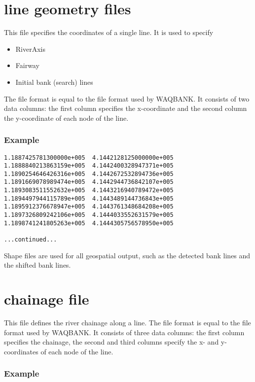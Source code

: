 \section{line geometry files}

This file specifies the coordinates of a single line.
It is used to specify

\begin{itemize}
\item RiverAxis
\item Fairway
\item Initial bank (search) lines
\end{itemize}

The file format is equal to the file format used by WAQBANK.
It consists of two data columns: the first column specifies the x-coordinate and the second column the y-coordinate of each node of the line.

\subsubsection*{Example}

\begin{Verbatim}
1.1887425781300000e+005  4.1442128125000000e+005
1.1888840213863159e+005  4.1442400328947371e+005
1.1890254646426316e+005  4.1442672532894736e+005
1.1891669078989474e+005  4.1442944736842107e+005
1.1893083511552632e+005  4.1443216940789472e+005
1.1894497944115789e+005  4.1443489144736843e+005
1.1895912376678947e+005  4.1443761348684208e+005
1.1897326809242106e+005  4.1444033552631579e+005
1.1898741241805263e+005  4.1444305756578950e+005

...continued...
\end{Verbatim}

Shape files are used for all geospatial output, such as the detected bank lines and the shifted bank lines.

\section{chainage file}

This file defines the river chainage along a line.
The file format is equal to the file format used by WAQBANK.
It consists of three data columns: the first column specifies the chainage, the second and third columns specify the x- and y-coordinates of each node of the line.

\subsubsection*{Example}

